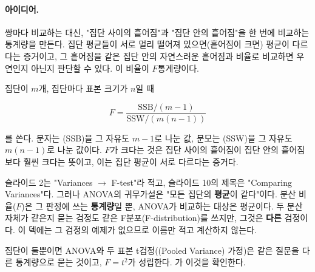 \paragraph{아이디어.} 쌍마다 비교하는 대신, "집단 사이의 흩어짐"과
"집단 안의 흩어짐"을 한 번에 비교하는 통계량을 만든다. 집단
평균들이 서로 멀리 떨어져 있으면(흩어짐이 크면) 평균이 다르다는
증거이고, 그 흩어짐을 같은 집단 안의 자연스러운 흩어짐과 비율로
비교하면 우연인지 아닌지 판단할 수 있다. 이 비율이 $F$통계량이다.

\begin{definition}[F통계량]
\label{def:f-statistic}
집단이 $m$개, 집단마다 표본 크기가 $n$일 때

\[
  F = \frac{\mathrm{SSB}/(m-1)}{\mathrm{SSW}/(m(n-1))}
\]

를 쓴다. 분자는 (SSB)을 그 자유도 $m-1$로 나눈
값, 분모는 (SSW)을 그 자유도 $m(n-1)$로 나눈
값이다. $F$가 크다는 것은 집단 사이의 흩어짐이 집단 안의 흩어짐보다
훨씬 크다는 뜻이고, 이는 집단 평균이 서로 다르다는 증거다.
\end{definition}

\begin{pitfall}
슬라이드 2는 "Variances $\to$ F-test"라 적고, 슬라이드 10의 제목은
"Comparing Variances"다. 그러나 ANOVA의 귀무가설은 "모든 집단의
\textbf{평균}이 같다"이다. 분산 비율($F$)은 그 판정에 쓰는
\textbf{통계량}일 뿐, ANOVA가 비교하는 대상은 평균이다. 두 분산 자체가
같은지 묻는 검정도 같은 F분포(F-distribution)를 쓰지만, 그것은
\textbf{다른} 검정이다.
이 덱에는 그 검정의 예제가 없으므로 이름만 적고 계산하지 않는다.
\end{pitfall}

\begin{keyidea}[핵심: 집단이 둘이면 $F = t^2$]
집단이 둘뿐이면 ANOVA와 두 표본 t검정((Pooled
Variance) 가정)은 같은 질문을
다른 통계량으로 묻는 것이고, $F = t^2$가 성립한다. 가
이것을 확인한다.
\end{keyidea}

